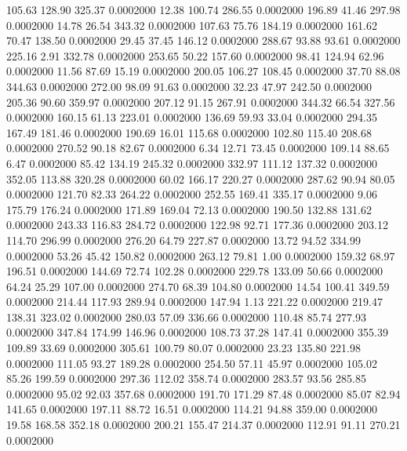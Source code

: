  105.63  128.90  325.37   0.0002000
  12.38  100.74  286.55   0.0002000
 196.89   41.46  297.98   0.0002000
  14.78   26.54  343.32   0.0002000
 107.63   75.76  184.19   0.0002000
 161.62   70.47  138.50   0.0002000
  29.45   37.45  146.12   0.0002000
 288.67   93.88   93.61   0.0002000
 225.16    2.91  332.78   0.0002000
 253.65   50.22  157.60   0.0002000
  98.41  124.94   62.96   0.0002000
  11.56   87.69   15.19   0.0002000
 200.05  106.27  108.45   0.0002000
  37.70   88.08  344.63   0.0002000
 272.00   98.09   91.63   0.0002000
  32.23   47.97  242.50   0.0002000
 205.36   90.60  359.97   0.0002000
 207.12   91.15  267.91   0.0002000
 344.32   66.54  327.56   0.0002000
 160.15   61.13  223.01   0.0002000
 136.69   59.93   33.04   0.0002000
 294.35  167.49  181.46   0.0002000
 190.69   16.01  115.68   0.0002000
 102.80  115.40  208.68   0.0002000
 270.52   90.18   82.67   0.0002000
   6.34   12.71   73.45   0.0002000
 109.14   88.65    6.47   0.0002000
  85.42  134.19  245.32   0.0002000
 332.97  111.12  137.32   0.0002000
 352.05  113.88  320.28   0.0002000
  60.02  166.17  220.27   0.0002000
 287.62   90.94   80.05   0.0002000
 121.70   82.33  264.22   0.0002000
 252.55  169.41  335.17   0.0002000
   9.06  175.79  176.24   0.0002000
 171.89  169.04   72.13   0.0002000
 190.50  132.88  131.62   0.0002000
 243.33  116.83  284.72   0.0002000
 122.98   92.71  177.36   0.0002000
 203.12  114.70  296.99   0.0002000
 276.20   64.79  227.87   0.0002000
  13.72   94.52  334.99   0.0002000
  53.26   45.42  150.82   0.0002000
 263.12   79.81    1.00   0.0002000
 159.32   68.97  196.51   0.0002000
 144.69   72.74  102.28   0.0002000
 229.78  133.09   50.66   0.0002000
  64.24   25.29  107.00   0.0002000
 274.70   68.39  104.80   0.0002000
  14.54  100.41  349.59   0.0002000
 214.44  117.93  289.94   0.0002000
 147.94    1.13  221.22   0.0002000
 219.47  138.31  323.02   0.0002000
 280.03   57.09  336.66   0.0002000
 110.48   85.74  277.93   0.0002000
 347.84  174.99  146.96   0.0002000
 108.73   37.28  147.41   0.0002000
 355.39  109.89   33.69   0.0002000
 305.61  100.79   80.07   0.0002000
  23.23  135.80  221.98   0.0002000
 111.05   93.27  189.28   0.0002000
 254.50   57.11   45.97   0.0002000
 105.02   85.26  199.59   0.0002000
 297.36  112.02  358.74   0.0002000
 283.57   93.56  285.85   0.0002000
  95.02   92.03  357.68   0.0002000
 191.70  171.29   87.48   0.0002000
  85.07   82.94  141.65   0.0002000
 197.11   88.72   16.51   0.0002000
 114.21   94.88  359.00   0.0002000
  19.58  168.58  352.18   0.0002000
 200.21  155.47  214.37   0.0002000
 112.91   91.11  270.21   0.0002000

